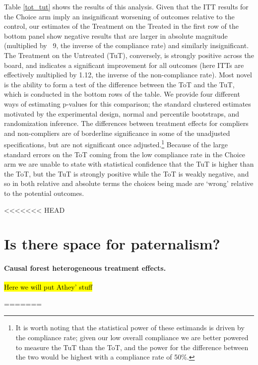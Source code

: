 \documentclass[oneside,11pt]{article}
\begin{document}
{Table \ref{tot_tut} shows the results of this analysis.  Given that the ITT results for the Choice arm imply an insignificant worsening of outcomes relative to the control, our estimates of the Treatment on the Treated in the first row of the bottom panel show negative results that are larger in absolute magnitude (multiplied by ~9, the inverse of the compliance rate) and similarly insignificant.  The Treatment on the Untreated (TuT), conversely, is strongly positive across the board, and indicates a significant improvement for all outcomes (here ITTs are effectively multiplied by 1.12, the inverse of the non-compliance rate).  Most novel is the ability to form a test of the difference between the ToT and the TuT, which is conducted in the bottom rows of the table.  We provide four different ways of estimating p-values for this comparison; the standard clustered estimates motivated by the experimental design, normal and percentile bootstraps, and randomization inference.  The differences between treatment effects for compliers and non-compliers are of borderline significance in some of the unadjusted specifications, but are not significant once adjusted.\footnote{It is worth noting that the statistical power of these estimands is driven by the compliance rate; given our low overall compliance we are better powered to measure the TuT than the ToT, and the power for the difference between the two would be highest with a compliance rate of 50\%.}   Because of the large standard errors on the ToT coming from the low compliance rate in the Choice arm we are unable to state with statistical confidence that the TuT is higher than the ToT, but the TuT is strongly positive while the ToT is weakly negative, and so in both relative and absolute terms the choices being made are `wrong' relative to the potential outcomes.


<<<<<<< HEAD


\section{Is there space for paternalism?}
\label{exploring}



\paragraph{Causal forest heterogeneous treatment effects.} 

\hl{Here we will put Athey' stuff}

=======
}
\end{document}

